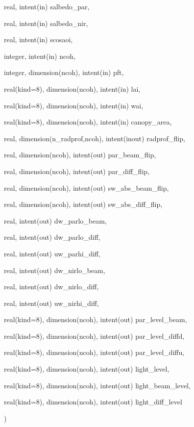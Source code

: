 {\begin{DoxyParamCaption}
\item[{real, intent(in)}]{salbedo\+\_\+par, }
\item[{real, intent(in)}]{salbedo\+\_\+nir, }
\item[{real, intent(in)}]{scosaoi, }
\item[{integer, intent(in)}]{ncoh, }
\item[{integer, dimension(ncoh), intent(in)}]{pft, }
\item[{real(kind=8), dimension(ncoh), intent(in)}]{lai, }
\item[{real(kind=8), dimension(ncoh), intent(in)}]{wai, }
\item[{real(kind=8), dimension(ncoh), intent(in)}]{canopy\+\_\+area, }
\item[{real, dimension(n\+\_\+radprof,ncoh), intent(inout)}]{radprof\+\_\+flip, }
\item[{real, dimension(ncoh), intent(out)}]{par\+\_\+beam\+\_\+flip, }
\item[{real, dimension(ncoh), intent(out)}]{par\+\_\+diff\+\_\+flip, }
\item[{real, dimension(ncoh), intent(out)}]{sw\+\_\+abs\+\_\+beam\+\_\+flip, }
\item[{real, dimension(ncoh), intent(out)}]{sw\+\_\+abs\+\_\+diff\+\_\+flip, }
\item[{real, intent(out)}]{dw\+\_\+parlo\+\_\+beam, }
\item[{real, intent(out)}]{dw\+\_\+parlo\+\_\+diff, }
\item[{real, intent(out)}]{uw\+\_\+parhi\+\_\+diff, }
\item[{real, intent(out)}]{dw\+\_\+nirlo\+\_\+beam, }
\item[{real, intent(out)}]{dw\+\_\+nirlo\+\_\+diff, }
\item[{real, intent(out)}]{uw\+\_\+nirhi\+\_\+diff, }
\item[{real(kind=8), dimension(ncoh), intent(out)}]{par\+\_\+level\+\_\+beam, }
\item[{real(kind=8), dimension(ncoh), intent(out)}]{par\+\_\+level\+\_\+diffd, }
\item[{real(kind=8), dimension(ncoh), intent(out)}]{par\+\_\+level\+\_\+diffu, }
\item[{real(kind=8), dimension(ncoh), intent(out)}]{light\+\_\+level, }
\item[{real(kind=8), dimension(ncoh), intent(out)}]{light\+\_\+beam\+\_\+level, }
\item[{real(kind=8), dimension(ncoh), intent(out)}]{light\+\_\+diff\+\_\+level}
\end{DoxyParamCaption}
)}\hypertarget{old__twostream__rad_8f90_ac90aec0e7fa711f6b96d200ae35c737a}{}\label{old__twostream__rad_8f90_ac90aec0e7fa711f6b96d200ae35c737a}


